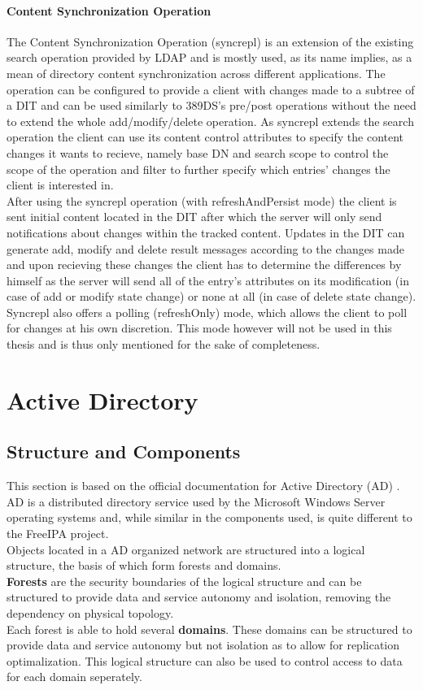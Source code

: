 \subsubsection{Content Synchronization Operation}
\label{subsec:syncrepl}
The Content Synchronization Operation (syncrepl) is an extension of the existing search operation provided by LDAP and is mostly used, as its name implies, as a mean of directory content synchronization across different applications.
The operation can be configured to provide a client with changes made to a subtree of a DIT and can be used similarly to 389DS's pre/post operations without the need to extend the whole add/modify/delete operation.
As syncrepl extends the search operation the client can use its content control attributes to specify the content changes it wants to recieve, namely base DN and search scope to control the scope of the operation and filter
to further specify which entries' changes the client is interested in.\\
After using the syncrepl operation (with refreshAndPersist mode) the client is sent initial content located in the DIT after which the server will only send notifications about changes within the tracked content. Updates in the DIT can generate add, modify and delete result messages according to the changes made and
upon recieving these changes the client has to determine the differences by himself as the server will send all of the entry's attributes on its modification (in case of add or modify state change) or none at all (in case of delete state change).\\
Syncrepl also offers a polling (refreshOnly) mode, which allows the client to poll for changes at his own discretion. This mode however will not be used in this thesis and is thus only mentioned for the sake of completeness.
\chapter{Active Directory}
\label{chp:ad}

\section{Structure and Components}
This section is based on the official documentation for Active Directory (AD) \cite{ADoverview}.\\
AD is a distributed directory service used by the Microsoft Windows Server operating systems and, while similar in the components used, is quite different to the FreeIPA project.\\
Objects located in a AD organized network are structured into a logical structure, the basis of which form forests and domains. \\
\textbf{Forests} are the security boundaries of the logical structure and can be structured to provide data and service autonomy and isolation, removing the dependency on physical topology. \\
Each forest is able to hold several \textbf{domains}. These domains can be structured to provide data and service autonomy but not isolation as to allow for replication optimalization.
This logical structure can also be used to control access to data for each domain seperately.

